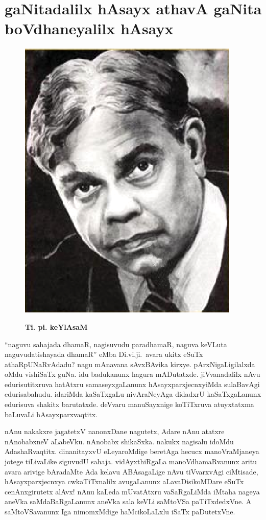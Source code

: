 \chapter{gaNitadalilx hAsayx athavA gaNita boVdhaneyalilx hAsayx}\label{chap14}


\begin{figure}
\vskip -0.5cm
  \centering\includegraphics[scale=0.8]{src/figures/t_p_kailasam.eps}
  
  {\bf Ti. pi. keYlAsaM}
    \end{figure}
    
    
\qquad ``naguvu sahajada dhamaR, nagisuvudu paradhamaR, naguva keVLuta naguvudatishayada dhamaR'' eMba Di.vi.ji.\ avara ukitx eSuTx\- athaRpUNaRvAdadu? nagu mAnavana sAvxBAvika kirxye. pArxNigaLigilalxda oMdu vishiSaTx guNa. idu  badukanunx hagura mADutatxde. jiVvanadalilx nAvu edurisutitxruva hatAtxru samaseyxgaLanunx hAsayxparxjecnxyiMda sulaBavAgi edurisabahudu. idariMda kaSaTxgaLu nivAraNe\-yAga didadxrU kaSaTxgaLanunx edurisuva shakitx barutatxde. deVvaru manuSayxnige koTiTxruva atuyxtatxma baLuvaLi hAsayxparxvaqtitx.

\smallskip

nAnu nakakxre jagatetxV nanonxDane nagutetx, Adare nAnu atatxre nAnobabxneV aLabeVku. nAnobabx shikaSxka. nakukx nagisalu idoMdu AdashaRvaqtitx. dinanitayxvU eLeyaroMdige beretAga hecucx manoVraMjaneya jotege tiLivaLike siguvudU sahaja. vidAyxthiRgaLa manoVdhamaRvanunx aritu avara arivige bAradaMte Ada kelavu ABAsagaLige nAvu tiVvarxvAgi ciMtisade, hAsayxparxjecnxya cwkaTiTxnalilx avugaLanunx aLavaDisikoMDare eSuTx cenAnxgirutetx alAvx! nAnu kaLeda mUvatAtxru vaSaRgaLiMda iMtaha nageya aneVka saMdaBaRgaLanunx aneVka sala keVLi saMtoVSa paTiTxdedxVne. A saMtoVSavanunx Iga nimomxMdige haMcikoLaLxlu iSaTx paDutetxVne.

